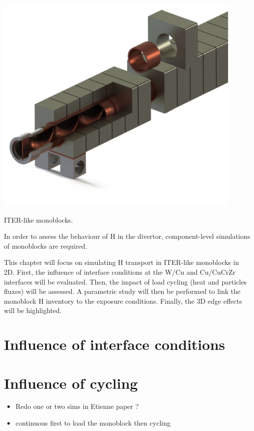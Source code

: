 \begin{marginfigure}
    \centering
    \includegraphics[width=\linewidth]{Figures/Chapter3/monoblocks_with_pipe.png}
    \caption{ITER-like monoblocks.}
    \label{fig: monoblocks with pipe}
\end{marginfigure}

In order to assess the behaviour of H in the divertor, component-level simulations of monoblocks are required.

This chapter will focus on simulating H transport in ITER-like monoblocks in 2D.
First, the influence of interface conditions at the W/Cu and Cu/CuCrZr interfaces will be evaluated.
Then, the impact of load cycling (heat and particles fluxes) will be assessed.
A parametric study will then be performed to link the monoblock H inventory to the exposure conditions.
Finally, the 3D edge effects will be highlighted.


\section{Influence of interface conditions}

\section{Influence of cycling}

\begin{itemize}
    \item Redo one or two sims in Etienne paper ?
    \item continuous first to load the monoblock then cycling
\end{itemize}

